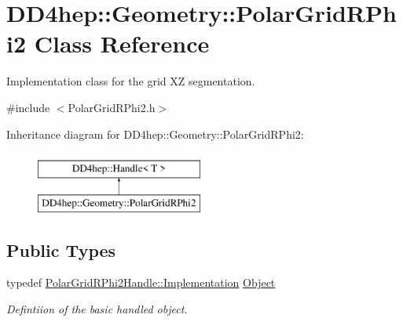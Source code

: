 \hypertarget{class_d_d4hep_1_1_geometry_1_1_polar_grid_r_phi2}{}\section{D\+D4hep\+:\+:Geometry\+:\+:Polar\+Grid\+R\+Phi2 Class Reference}
\label{class_d_d4hep_1_1_geometry_1_1_polar_grid_r_phi2}


Implementation class for the grid XZ segmentation.  




{\ttfamily \#include $<$Polar\+Grid\+R\+Phi2.\+h$>$}

Inheritance diagram for D\+D4hep\+:\+:Geometry\+:\+:Polar\+Grid\+R\+Phi2\+:\begin{figure}[H]
\begin{center}
\leavevmode
\includegraphics[height=2.000000cm]{class_d_d4hep_1_1_geometry_1_1_polar_grid_r_phi2}
\end{center}
\end{figure}
\subsection*{Public Types}
\begin{DoxyCompactItemize}
\item 
typedef \hyperlink{class_d_d4hep_1_1_handle_ad7ff728a25806079516b8965b9113f1a}{Polar\+Grid\+R\+Phi2\+Handle\+::\+Implementation} \hyperlink{class_d_d4hep_1_1_geometry_1_1_polar_grid_r_phi2_a1067131b00d726a9739132de2eea6d86}{Object}
\begin{DoxyCompactList}\small\item\em Defintiion of the basic handled object. \end{DoxyCompactList}\end{DoxyCompactItemize}
